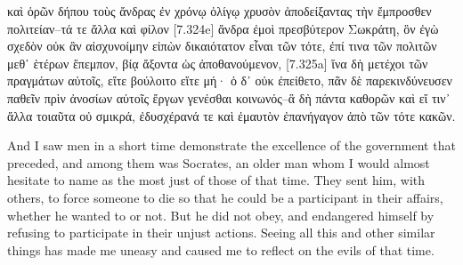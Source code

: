 \documentclass[12pt]{book}
\begin{document}
\begin{pairs}
\begin{Rightside}
\begin{Ancient Greek}
\beginnumbering
\pstart
καὶ ὁρῶν δήπου τοὺς ἄνδρας ἐν χρόνῳ ὀλίγῳ χρυσὸν ἀποδείξαντας τὴν ἔμπροσθεν πολιτείαν--τά τε ἄλλα καὶ φίλον [7.324e] ἄνδρα ἐμοὶ πρεσβύτερον Σωκράτη, ὃν ἐγὼ σχεδὸν οὐκ ἂν αἰσχυνοίμην εἰπὼν δικαιότατον εἶναι τῶν τότε, ἐπί τινα τῶν πολιτῶν μεθ᾽ ἑτέρων ἔπεμπον, βίᾳ ἄξοντα ὡς ἀποθανούμενον, [7.325a] ἵνα δὴ μετέχοι τῶν πραγμάτων αὐτοῖς, εἴτε βούλοιτο εἴτε μή· ὁ δ᾽ οὐκ ἐπείθετο, πᾶν δὲ παρεκινδύνευσεν παθεῖν πρὶν ἀνοσίων αὐτοῖς ἔργων γενέσθαι κοινωνός--ἃ δὴ πάντα καθορῶν καὶ εἴ τιν᾽ ἄλλα τοιαῦτα οὐ σμικρά, ἐδυσχέρανά τε καὶ ἐμαυτὸν ἐπανήγαγον ἀπὸ τῶν τότε κακῶν.	
\pend
\endnumbering
\end{Ancient Greek}
\end{Rightside}
\begin{Leftside}
\begin{English}
\beginnumbering
\pstart
And I saw men in a short time demonstrate the excellence of the government that preceded, and among them was Socrates, an older man whom I would almost hesitate to name as the most just of those of that time. They sent him, with others, to force someone to die so that he could be a participant in their affairs, whether he wanted to or not. But he did not obey, and endangered himself by refusing to participate in their unjust actions. Seeing all this and other similar things has made me uneasy and caused me to reflect on the evils of that time.
\pend
\endnumbering
\end{English}
\end{Leftside}
\end{pairs}
\Columns
\end{document}
